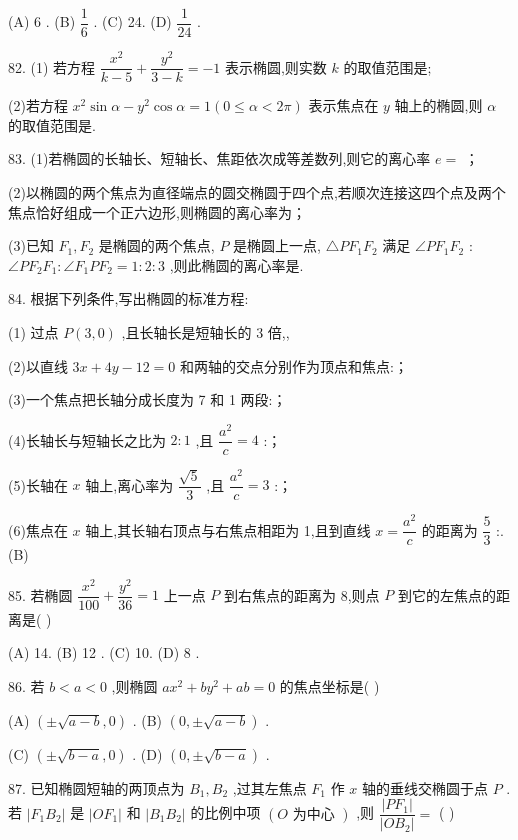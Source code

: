 (A) 6 . (B) $\dfrac{1}{6}$ . (C) 24. (D) $\dfrac{1}{24}$ .

82. (1) 若方程 $\dfrac{{x}^{2}}{k - 5} + \dfrac{{y}^{2}}{3 - k} =  - 1$ 表示椭圆,则实数 $k$ 的取值范围是\blkda{};

(2)若方程 ${x}^{2}\sin \alpha  - {y}^{2}\cos \alpha  = 1\left( {0 \leq  \alpha  < {2\pi }}\right)$ 表示焦点在 $y$ 轴上的椭圆,则 $\alpha$ 的取值范围是\blkda{}.

83. (1)若椭圆的长轴长、短轴长、焦距依次成等差数列,则它的离心率 $e =$ \blkda{}；

(2)以椭圆的两个焦点为直径端点的圆交椭圆于四个点,若顺次连接这四个点及两个焦点恰好组成一个正六边形,则椭圆的离心率为\blkda{}；

(3)已知 ${F}_{1},{F}_{2}$ 是椭圆的两个焦点, $P$ 是椭圆上一点, $\bigtriangleup P{F}_{1}{F}_{2}$ 满足 $\angle P{F}_{1}{F}_{2}$ : $\angle P{F}_{2}{F}_{1} : \angle {F}_{1}P{F}_{2} = 1 : 2 : 3$ ,则此椭圆的离心率是\blkda{}.

84. 根据下列条件,写出椭圆的标准方程:

(1) 过点 $P\left( {3,0}\right)$ ,且长轴长是短轴长的 3 倍,\blkda{},

(2)以直线 ${3x} + {4y} - {12} = 0$ 和两轴的交点分别作为顶点和焦点:\blkda{}；

(3)一个焦点把长轴分成长度为 7 和 1 两段:\blkda{}；

(4)长轴长与短轴长之比为 $2 : 1$ ,且 $\dfrac{{a}^{2}}{c} = 4$ :\blkda{}；

(5)长轴在 $x$ 轴上,离心率为 $\dfrac{\sqrt{5}}{3}$ ,且 $\dfrac{{a}^{2}}{c} = 3$ :\blkda{}；

(6)焦点在 $x$ 轴上,其长轴右顶点与右焦点相距为 1,且到直线 $x = \dfrac{{a}^{2}}{c}$ 的距离为 $\dfrac{5}{3}$ :\blkda{}. (B)

85. 若椭圆 $\dfrac{{x}^{2}}{100} + \dfrac{{y}^{2}}{36} = 1$ 上一点 $P$ 到右焦点的距离为 8,则点 $P$ 到它的左焦点的距离是(   )

(A) 14. (B) 12 . (C) 10. (D) 8 .

86. 若 $b < a < 0$ ,则椭圆 $a{x}^{2} + b{y}^{2} + {ab} = 0$ 的焦点坐标是(   )

(A) $\left( {\pm \sqrt{a - b},0}\right)$ . (B) $\left( {0, \pm  \sqrt{a - b}}\right)$ .

(C) $\left( {\pm \sqrt{b - a},0}\right)$ . (D) $\left( {0, \pm  \sqrt{b - a}}\right)$ .

87. 已知椭圆短轴的两顶点为 ${B}_{1},{B}_{2}$ ,过其左焦点 ${F}_{1}$ 作 $x$ 轴的垂线交椭圆于点 $P$ . 若 $\left| {{F}_{1}{B}_{2}}\right|$ 是 $\left| {O{F}_{1}}\right|$ 和 $\left| {{B}_{1}{B}_{2}}\right|$ 的比例中项 $\left( {O\text{ 为中心 }}\right)$ ,则 $\dfrac{\left| P{F}_{1}\right| }{\left| O{B}_{2}\right| } =$ (   )


